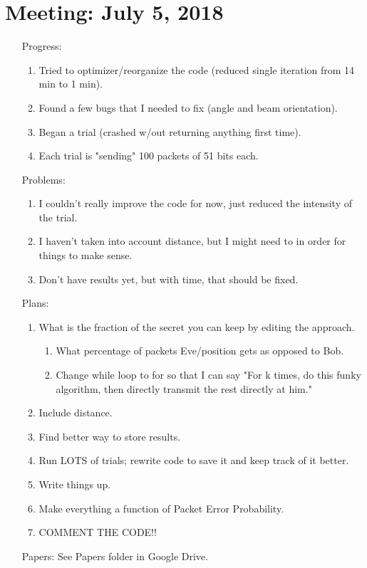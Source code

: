 \documentclass[11pt]{article}
\begin{document}
\section{Meeting: July 5, 2018}
\begin{itemize}
\item[Progress:]
\begin{enumerate}
\item Tried to optimizer/reorganize the code (reduced single iteration from 14 min to 1 min).
\item Found a few bugs that I needed to fix (angle and beam orientation).
\item Began a trial (crashed w/out returning anything first time).
\item Each trial is "sending" 100 packets of 51 bits each.
\end{enumerate}

\item[Problems:]
\begin{enumerate}
\item I couldn't really improve the code for now, just reduced the intensity of the trial.
\item I haven't taken into account distance, but I might need to in order for things to make sense.
\item Don't have results yet, but with time, that should be fixed.
\end{enumerate}

\item[Plans:]
\begin{enumerate}
\item What is the fraction of the secret you can keep by editing the approach.
\begin{enumerate}
\item What percentage of packets Eve/position gets as opposed to Bob.
\item Change while loop to for so that I can say "For k times, do this funky algorithm, then directly transmit the rest directly at him."
\end{enumerate}
\item Include distance.
\item Find better way to store results.
\item Run LOTS of trials; rewrite code to save it and keep track of it better.
\item Write things up.
\item Make everything a function of Packet Error Probability.
\item COMMENT THE CODE!!
\end{enumerate}

\item[Papers:]
See Papers folder in Google Drive.

\end{itemize}
\end{document}
